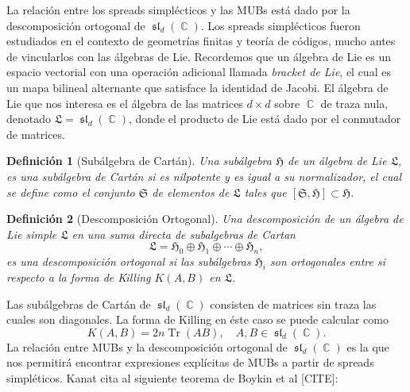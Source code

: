 \documentclass[a4paper]{report}
\DeclareMathOperator{\C}{\mathbb{C}}
\DeclareMathOperator{\Tr}{Tr}
\DeclareMathOperator{\Sl}{\mathfrak{sl}}
\newtheorem{definition}{Definición}
\begin{document}
  La relación entre los spreads simplécticos y las MUBs está
  dado por la descomposición ortogonal de $\Sl_d(\C)$. Los
  spreads simplécticos fueron estudiados en el contexto de
  geometrías finitas y teoría de códigos, mucho antes de
  vincularlos con las álgebras de Lie. Recordemos que un
  álgebra de Lie es un espacio vectorial con una operación
  adicional llamada \textit{bracket de Lie}, el cual es un
  mapa bilineal alternante que satisface la identidad de
  Jacobi. El álgebra de Lie que nos interesa es el álgebra
  de las matrices $d \times d$ sobre $\C$ de traza nula,
  denotado $\mathfrak{L} = \Sl_d(\C)$, donde el producto de
  Lie está dado por el conmutador de matrices.

  \begin{definition}[Subálgebra de Cartán]
    Una subálgebra $\mathfrak{H}$ de un álgebra de Lie
    $\mathfrak{L}$, es una subálgebra de Cartán si es
    nilpotente y es igual a su normalizador, el cual se
    define como el conjunto $\mathfrak{S}$ de elementos de
    $\mathfrak{L}$ tales que $[\mathfrak{S}, \mathfrak{H}]
    \subset \mathfrak{H}$.
  \end{definition}

  \begin{definition}[Descomposición Ortogonal]
    Una descomposición de un álgebra de Lie simple
    $\mathfrak{L}$ en una suma directa de subalgebras de
    Cartan
    \begin{equation}
      \mathfrak{L}
      = \mathfrak{H}_0 \oplus \mathfrak{H}_1 \oplus \cdots
      \oplus \mathfrak{H}_n,
    \end{equation}
    es una descomposición ortogonal si las subálgebras
    $\mathfrak{H}_i$ son ortogonales entre si respecto a la
    forma de Killing $K(A,B)$ en $\mathfrak{L}$.
  \end{definition}

  Las subálgebras de Cartán de $\Sl_d(\C)$ consisten de
  matrices sin traza las cuales son diagonales.  La forma de
  Killing en éste caso se puede calcular como
  \begin{equation}
    K(A,B)
    = 2n \Tr(AB),
    \quad A,B \in \Sl_d(\C).
  \end{equation}
  La relación entre MUBs y la descomposición ortogonal de
  $\Sl_d(\C)$ es la que nos permitirá encontrar expresiones
  explícitas de MUBs a partir de spreads simpléticos. Kanat
  cita al siguiente teorema de Boykin et al [CITE]:
\end{document}

